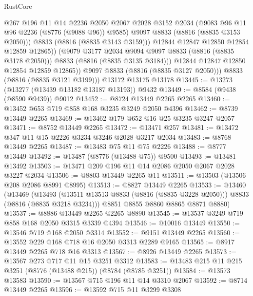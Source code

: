 \begin{lexlean}{RustCore}
\begin{coremodule}
                      @267
                      @196
                      @11
                      @14
                      @2236
                      @2050
                      @2067
                      @2028
                      @3152
                      @2034
                      (@9083 @96 @11 @96 @2236 (@8776 (@9088 @96)) @9585)
                      @9097
                      @8833
                      (@8816 (@8835 @3153 @2050)))
                    @8833
                    (@8816 (@8835 @3143 @3159)))
                  @12844
                  @12847
                  @12850
                  @12854
                  @12859
                  @12865))
              (@9079 @3177 @2034 @9094 @9097 @8833 (@8816 (@8835 @3178 @2050)))
              @8833
              (@8816 (@8835 @3135 @3184)))
            @12844
            @12847
            @12850
            @12854
            @12859
            @12865))
        @9097
        @8833
        (@8816 (@8835 @3127 @2050)))
      @8833
      (@8816 (@8835 @3121 @3199)))
    @13172
    @13175
    @13178
@13445 := @13273 (@13277 (@13439 @13182 @13187 @13193)) @9432
@13449 := @8584 (@9438 (@8590 @9439)) @9012
@13452 := @8724 @13449 @2265 @2265
@13460 := @13452 @653 @719 @858 @168 @3235 @3249 @2050 @4396
@13462 := @8739 @13449 @2265
@13469 := @13462 @179 @652 @16 @25 @3235 @3247 @2057
@13471 := @8752 @13449 @2265
@13472 := @13471 @257
@13481 := @13472 @347 @11 @15 @2226 @3234 @3246 @2028 @3217 @2034
@13483 := @8768 @13449 @2265
@13487 := @13483 @75 @11 @75 @2226
@13488 := @8777 @13449
@13492 := @13487 (@8776 (@13488 @75)) @9500
@13493 := @13481 @13492
@13503 := @13471 @209 @196 @11 @14 @2086 @2050 @2067 @2028 @3227 @2034
@13506 := @8803 @13449 @2265 @11
@13511 := @13503 (@13506 @208 @2086 @8991 @8995)
@13513 := @8827 @13449 @2265
@13533 := @13460
    (@13469
      (@13493 (@13511 @13513 @8833 (@8816 (@8835 @3228 @2050))) @8833 (@8816 (@8835 @3218 @3234)))
      @8851
      @8855
      @8860
      @8865
      @8871
      @8880)
@13537 := @8886 @13449 @2265 @2265 @8890
@13545 := @13537 @3249 @719 @858 @168 @2050 @3315 @3339 @4394
@13546 := @10016 @13449
@13550 := @13546 @719 @168 @2050 @3314
@13552 := @9151 @13449 @2265
@13560 := @13552 @229 @168 @718 @16 @2050 @3313 @2289 @9165
@13565 := @8917 @13449 @2265 @718 @16 @3313
@13567 := @8926 @13449 @2265
@13573 := @13567 @273 @717 @11 @15 @3251 @3312
@13583 := @13483 @215 @11 @215 @3251 (@8776 (@13488 @215)) (@8784 (@8785 @3251))
@13584 := @13573 @13583
@13590 := @13567 @715 @196 @11 @14 @3310 @2067
@13592 := @8714 @13449 @2265
@13596 := @13592 @715 @11 @3299 @3308

\end{coremodule}
\end{lexlean}
